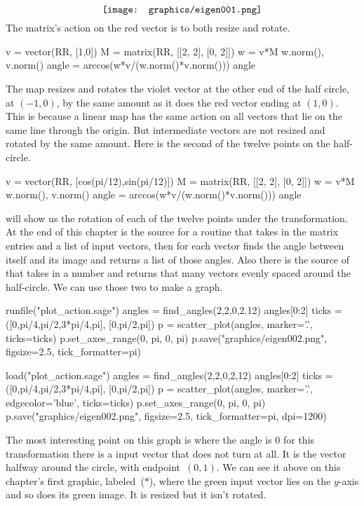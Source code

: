 \begin{equation*}
  \vcenteredhbox{\texttt{[image: graphics/eigen001.png]}}
\end{equation*}
The matrix's action on the red vector is to both resize and rotate.
\begin{sageoutput}
v = vector(RR, [1,0])
M = matrix(RR, [[2, 2], [0, 2]])
w = v*M
w.norm(), v.norm() 
angle = arccos(w*v/(w.norm()*v.norm())) 
angle 
\end{sageoutput}
\noindent The map resizes and rotates the violet vector at the other end of the 
half circle, at $(-1,0)$, by the
same amount as it does the red vector ending at $(1,0)$. 
This is because a linear map has the same action on 
all vectors that lie on the same line through the origin.
But intermediate vectors are not resized and rotated by the same
amount.
Here is the second of the twelve points on the half-circle.
\begin{sageoutput}
v = vector(RR, [cos(pi/12),sin(pi/12)])
M = matrix(RR, [[2, 2], [0, 2]])
w = v*M
w.norm(), v.norm() 
angle = arccos(w*v/(w.norm()*v.norm())) 
angle 
\end{sageoutput}

\Sage{} will show us the rotation of each of the twelve points 
under the transformation.
At the end of this chapter is the source for a routine 
that takes in the matrix entries and a list of input vectors, then
for each vector finds the angle between itself and its image and
returns a list of those angles.
Also there is the source of  that takes in a
number and returns that many vectors evenly spaced around the half-circle. 
We can use those two to make a graph.
\begin{sageoutput}[d,0,1]
runfile("plot_action.sage")  
angles = find_angles(2,2,0,2,12)
angles[0:2]
ticks = ([0,pi/4,pi/2,3*pi/4,pi], [0,pi/2,pi])
p = scatter_plot(angles, marker='.', ticks=ticks)
p.set_axes_range(0, pi, 0, pi) 
p.save("graphics/eigen002.png", figsize=2.5, tick_formatter=pi)
\end{sageoutput}
\begin{sagesilent}
load("plot_action.sage")  
angles = find_angles(2,2,0,2,12)
angles[0:2]
ticks = ([0,pi/4,pi/2,3*pi/4,pi], [0,pi/2,pi])
p = scatter_plot(angles, marker='.', edgecolor='blue', ticks=ticks)
p.set_axes_range(0, pi, 0, pi) 
p.save("graphics/eigen002.png", figsize=2.5, tick_formatter=pi, dpi=1200)
\end{sagesilent}
\begin{center}
\end{center}
The most interesting point on this graph is where the angle is $0$\Dash
for this transformation there is a input vector that does not turn at all.
It is the vector halfway around the circle, with endpoint~$(0,1)$. 
We can see it above on this chapter's first graphic, labeled~($*$), 
where the green input vector lies on the $y$-axis and so does its green image.
It is resized but it isn't rotated.




